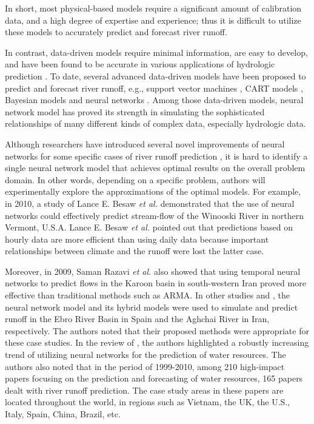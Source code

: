 In short, most physical-based models require a significant amount of calibration data, and a high degree of expertise and experience; thus it is difficult to utilize these models to accurately predict and forecast river runoff.

In contrast, data-driven models require minimal information, are easy to develop, and have been found to be accurate in various applications of hydrologic prediction \cite{ANN:ref_64, ANN:ref_73, ANN:ref_80, ANN:ref_81, ANN:ref_86, ANN:ref_87, ANN:ref_88}. To date, several advanced data-driven models have been proposed to predict and forecast river runoff, e.g., support vector machines \cite{ANN:ref_64, ANN:ref_80, ANN:ref_86}, CART models \cite{ANN:ref_73}, Bayesian models \cite{ANN:ref_73} and neural networks \cite{ANN:ref_88, ANN:ref_87}. Among those data-driven models, neural network model has proved its strength in simulating the sophisticated relationships of many different kinds of complex data, especially hydrologic data. 

Although researchers have introduced several novel improvements of neural networks for some specific cases of river runoff prediction \cite{rein:ref_01, ANN:ref_66, ANN:ref_67, ANN:ref_75, ANN:ref_79, ANN:ref_78, ANN:ref_90}, it is hard to identify a single neural network model that achieves optimal results on the overall problem domain. In other words, depending on a specific problem, authors will experimentally explore the approximations of the optimal models. For example, in 2010, a study of Lance E. Besaw \textit{et al.} \cite{ANN:ref_65} demonstrated that the use of neural networks could effectively predict stream-flow of the Winooski River in northern Vermont, U.S.A. Lance E. Besaw \textit{et al.} pointed out that predictions based on hourly data are more efficient than using daily data because important relationships between climate and the runoff were lost the latter case.

Moreover, in 2009, Saman Razavi \textit{et al.} \cite{ANN:ref_66} also showed that using temporal neural networks to predict flows in the Karoon basin in south-western Iran proved more effective than traditional methods such as ARMA. In other studies \cite{ANN:ref_74} and \cite{ANN:ref_75}, the neural network model and its hybrid models were used to simulate and predict runoff in the Ebro River Basin in Spain and the Aghchai River in Iran, respectively. The authors noted that their proposed methods were appropriate for these case studies. In the review of \cite{ANN:ref_87}, the authors highlighted a robustly increasing trend of utilizing neural networks for the prediction of water resources. The authors also noted that in the period of 1999-2010, among 210 high-impact papers focusing on the prediction and forecasting of water resources, 165 papers dealt with river runoff prediction. The case study areas in these papers are located throughout the world, in regions such as Vietnam, the UK, the U.S., Italy, Spain, China, Brazil, etc.

